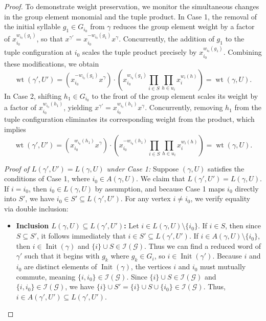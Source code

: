 \documentclass[10pt,a4paper]{amsart}
\begin{document}
\begin{proof}
To demonstrate weight preservation, we monitor the simultaneous changes in the group element monomial and the tuple product. In Case 1, the removal of the initial syllable $g_1 \in G_{i_0}$ from $\gamma$ reduces the group element weight by a factor of $x_{i_0}^{w_{i_0}(g_1)}$, so that $x^{\gamma'} = x_{i_0}^{-w_{i_0}(g_1)} x^\gamma$. Concurrently, the addition of $g_1$ to the tuple configuration at $i_0$ scales the tuple product precisely by $x_{i_0}^{w_{i_0}(g_1)}$. Combining these modifications, we obtain
\begin{equation*}
\operatorname{wt}(\gamma',U') = \left(x_{i_0}^{-w_{i_0}(g_1)} x^\gamma\right) \cdot \left( x_{i_0}^{w_{i_0}(g_1)} \prod_{i \in S} \prod_{h \in u_i} x_i^{w_i(h)} \right) = \operatorname{wt}(\gamma,U).
\end{equation*}
In Case 2, shifting $h_1 \in G_{i_0}$ to the front of the group element scales its weight by a factor of $x_{i_0}^{w_{i_0}(h_1)}$, yielding $x^{\gamma'} = x_{i_0}^{w_{i_0}(h_1)} x^\gamma$. Concurrently, removing $h_1$ from the tuple configuration eliminates its corresponding weight from the product, which implies
\begin{equation*}
\operatorname{wt}(\gamma',U') = \left(x_{i_0}^{w_{i_0}(h_1)} x^\gamma\right) \cdot \left( x_{i_0}^{-w_{i_0}(h_1)} \prod_{i \in S} \prod_{h \in u_i} x_i^{w_i(h)} \right) = \operatorname{wt}(\gamma,U).
\end{equation*}

\smallskip
\noindent\textit{  Proof of $L(\gamma', U') = L(\gamma, U)$ under Case 1:}
Suppose $(\gamma, U)$ satisfies the conditions of Case 1, where $i_0 \in A(\gamma, U)$. We claim that $L(\gamma', U') = L(\gamma, U)$. If $i = i_0$, then $i_0 \in L(\gamma, U)$ by assumption, and because Case 1 maps $i_0$ directly into $S'$, we have $i_0 \in S' \subseteq L(\gamma', U')$. For any vertex $i \neq i_0$, we verify equality via double inclusion:
\begin{itemize}
    \item \textbf{Inclusion $L(\gamma, U) \subseteq L(\gamma', U')$:} Let $i \in L(\gamma, U) \setminus \{i_0\}$. If $i \in S$, then since $S \subseteq S'$, it follows immediately that $i \in S' \subseteq L(\gamma', U')$. If $i \in A(\gamma, U) \setminus \{i_0\}$, then $i \in \operatorname{Init}(\gamma)$ and $\{i\} \cup S \in \mathcal{I}(\mathcal{G})$. Thus we can find a reduced word of $\gamma'$ such that it begins with $g_k$ where $g_k\in G_i$, so $i \in \operatorname{Init}(\gamma')$. Because $i$ and $i_0$ are distinct elements of $\operatorname{Init}(\gamma)$, the vertices $i$ and $i_0$ must mutually commute, meaning $\{i, i_0\} \in \mathcal{I}(\mathcal{G})$.  Since $\{i\} \cup S \in \mathcal{I}(\mathcal{G})$ and $\{i, i_0\} \in \mathcal{I}(\mathcal{G})$, we have $\{i\} \cup S' = \{i\} \cup S \cup \{i_0\} \in \mathcal{I}(\mathcal{G})$. Thus, $i \in A(\gamma', U') \subseteq L(\gamma', U')$.


\end{itemize}
\end{proof}
\end{document}
